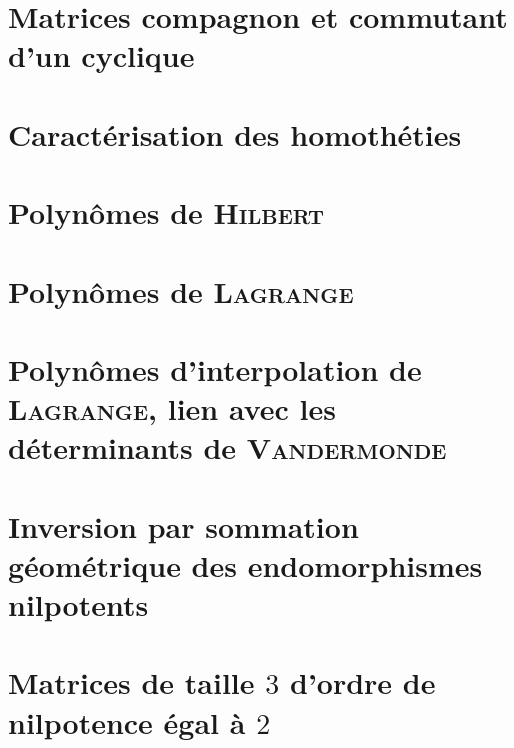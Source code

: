 \section{Matrices compagnon et commutant d'un cyclique}


\section{Caractérisation des homothéties}


\section{Polynômes de \textsc{Hilbert}} \label{polynome_hilbert}


\section{Polynômes de \textsc{Lagrange}} 


\section{Polynômes d'interpolation de \textsc{Lagrange}, lien avec les déterminants de \textsc{Vandermonde}}


\section{Inversion par sommation géométrique des endomorphismes nilpotents} 


\section{Matrices de taille \texorpdfstring{$3$}{3} d'ordre de nilpotence égal à \texorpdfstring{$2$}{2}} 


